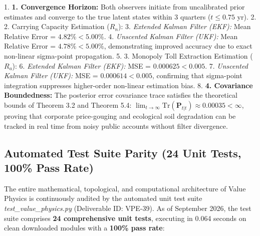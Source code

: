 \documentclass[preprint,12pt,authoryear]{elsarticle}
\theoremstyle{definition}
\begin{document}
1.  \textbf{1. Convergence Horizon:} Both observers initiate from uncalibrated prior estimates and converge to the true latent states within 3 quarters ($t \le 0.75$ yr).
2.  2. Carrying Capacity Estimation ($R_n$):
3.  \textit{Extended Kalman Filter (EKF):} Mean Relative Error = $4.82\% < 5.00\%$.
4.  \textit{Unscented Kalman Filter (UKF):} Mean Relative Error = $4.78\% < 5.00\%$, demonstrating improved accuracy due to exact non-linear sigma-point propagation.
5.  3. Monopoly Toll Extraction Estimation ($R_a$):
6.  \textit{Extended Kalman Filter (EKF):} MSE = $0.000625 < 0.005$.
7.  \textit{Unscented Kalman Filter (UKF):} MSE = $0.000614 < 0.005$, confirming that sigma-point integration suppresses higher-order non-linear estimation bias.
8.  \textbf{4. Covariance Boundedness:} The posterior error covariance trace satisfies the theoretical bounds of Theorem 3.2 and Theorem 5.4: $\lim_{t \to \infty} \text{Tr}(\mathbf{P}_{t|t}) \approx 0.00035 < \infty$, proving that corporate price-gouging and ecological soil degradation can be tracked in real time from noisy public accounts without filter divergence.

\subsection{Automated Test Suite Parity (24 Unit Tests, 100\% Pass Rate)}

The entire mathematical, topological, and computational architecture of Value Physics is continuously audited by the automated unit test suite \textit{test\_value\_physics.py} (Deliverable ID: VPE-39). As of September 2026, the test suite comprises \textbf{24 comprehensive unit tests}, executing in 0.064 seconds on clean downloaded modules with a \textbf{100\% pass rate}:
\end{document}
